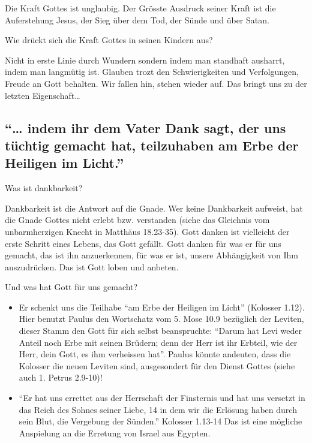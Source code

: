 \documentclass[
  12pt,
]{krantz}
\providecommand{\tightlist}{%
  \setlength{\itemsep}{0pt}\setlength{\parskip}{0pt}}
\begin{document}
Die Kraft Gottes ist unglaubig. Der Grösste Ausdruck seiner Kraft ist die Auferstehung Jesus, der Sieg über dem Tod, der Sünde und über Satan.

Wie drückt sich die Kraft Gottes in seinen Kindern aus?

Nicht in erste Linie durch Wundern sondern indem man standhaft ausharrt, indem man langmütig ist. Glauben trozt den Schwierigkeiten und Verfolgungen, Freude an Gott behalten. Wir fallen hin, stehen wieder auf. Das bringt uns zu der letzten Eigenschaft\ldots{}

\hypertarget{indem-ihr-dem-vater-dank-sagt-der-uns-tuxfcchtig-gemacht-hat-teilzuhaben-am-erbe-der-heiligen-im-licht.}{%
\subsection{``\ldots{} indem ihr dem Vater Dank sagt, der uns tüchtig gemacht hat, teilzuhaben am Erbe der Heiligen im Licht.''}\label{indem-ihr-dem-vater-dank-sagt-der-uns-tuxfcchtig-gemacht-hat-teilzuhaben-am-erbe-der-heiligen-im-licht.}}

Was ist dankbarkeit?

Dankbarkeit ist die Antwort auf die Gnade. Wer keine Dankbarkeit aufweist, hat die Gnade Gottes nicht erlebt bzw. verstanden (siehe das Gleichnis vom unbarmherzigen Knecht in Matthäus 18.23-35). Gott danken ist vielleicht der erste Schritt eines Lebens, das Gott gefällt. Gott danken für was er für uns gemacht, das ist ihn anzuerkennen, für was er ist, unsere Abhängigkeit von Ihm auszudrücken. Das ist Gott loben und anbeten.

Und was hat Gott für uns gemacht?

\begin{itemize}
\tightlist
\item
  Er schenkt uns die Teilhabe ``am Erbe der Heiligen im Licht'' (Kolosser 1.12). Hier benutzt Paulus den Wortschatz vom 5. Mose 10.9 bezüglich der Leviten, dieser Stamm den Gott für sich selbst beanspruchte: ``Darum hat Levi weder Anteil noch Erbe mit seinen Brüdern; denn der Herr ist ihr Erbteil, wie der Herr, dein Gott, es ihm verheissen hat''. Paulus könnte andeuten, dass die Kolosser die neuen Leviten sind, ausgesondert für den Dienst Gottes (siehe auch 1. Petrus 2.9-10)!
\item
  ``Er hat uns errettet aus der Herrschaft der Finsternis und hat uns versetzt in das Reich des Sohnes seiner Liebe, 14 in dem wir die Erlösung haben durch sein Blut, die Vergebung der Sünden.'' Kolosser 1.13-14 Das ist eine mögliche Anspielung an die Erretung von Israel aus Egypten.
\end{itemize}
\end{document}
